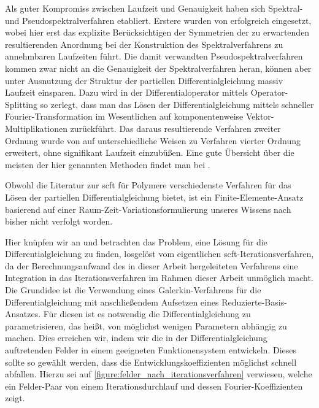 Als guter Kompromiss zwischen Laufzeit und Genauigkeit haben sich Spektral- und Pseudospektralverfahren etabliert.
Erstere wurden von \textcite{Matsen:1994bz} erfolgreich eingesetzt, wobei hier erst das explizite Berücksichtigen der Symmetrien der zu erwartenden resultierenden Anordnung bei der Konstruktion des Spektralverfahrens zu annehmbaren Laufzeiten führt.
Die damit verwandten Pseudospektralverfahren kommen zwar nicht an die Genauigkeit der Spektralverfahren heran, können aber unter Ausnutzung der Struktur der partiellen Differentialgleichung massiv Laufzeit einsparen.
Dazu wird in \cite{Rasmussen:2002kt} der Differentialoperator mittels Operator-Splitting so zerlegt, dass man das Lösen der Differentialgleichung mittels schneller Fourier-Transformation im Wesentlichen auf komponentenweise Vektor-Multiplikationen zurückführt.
Das daraus resultierende Verfahren zweiter Ordnung wurde von \cite{GarciaCervera:2006uu,Ranjan:2007kl} auf unterschiedliche Weisen zu Verfahren vierter Ordnung erweitert, ohne signifikant Laufzeit einzubüßen.
Eine gute Übersicht über die meisten der hier genannten Methoden findet man bei \textcites[Section 3.6]{Fredrickson:2006th}{Audus:2013ep}.

Obwohl die Literatur zur \ac{scft} für Polymere verschiedenste Verfahren für das Lösen der partiellen Differentialgleichung bietet, ist ein Finite-Elemente-Ansatz basierend auf einer Raum-Zeit-Variationsformulierung unseres Wissens nach bisher nicht verfolgt worden.

Hier knüpfen wir an und betrachten das Problem, eine Lösung für die Differentialgleichung zu finden, losgelöst vom eigentlichen \ac{scft}-Iterationsverfahren, da der Berechnungsaufwand des in dieser Arbeit hergeleiteten Verfahrens eine Integration in das Iterationsverfahren im Rahmen dieser Arbeit unmöglich macht.
Die Grundidee ist die Verwendung eines Galerkin-Verfahrens für die Differentialgleichung mit anschließendem Aufsetzen eines Reduzierte-Basis-Ansatzes.
Für diesen ist es notwendig die Differentialgleichung zu parametrisieren, das heißt, von möglichst wenigen Parametern abhängig zu machen.
Dies erreichen wir, indem wir die in der Differentialgleichung auftretenden Felder in einem geeigneten Funktionensystem entwickeln.
Dieses sollte so gewählt werden, dass die Entwicklungskoeffizienten möglichst schnell abfallen.
Hierzu sei auf \cref{figure:felder_nach_iterationsverfahren} verwiesen, welche ein Felder-Paar von einem Iterationsdurchlauf und dessen Fourier-Koeffizienten zeigt.

